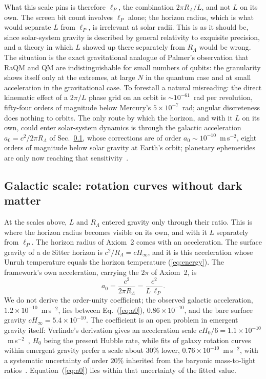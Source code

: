\documentclass[aps,prd,twocolumn,superscriptaddress,nofootinbib,showkeys]{revtex4-2}
\begin{document}
What this scale pins is therefore $\ell_P$, the combination $2\pi R_\Lambda/L$, and not $L$ on its own. The screen bit count involves $\ell_P$ alone; the horizon radius, which is what would separate $L$ from $\ell_P$, is irrelevant at solar radii. This is as it should be, since solar-system gravity is described by general relativity to exquisite precision, and a theory in which $L$ showed up there separately from $R_\Lambda$ would be wrong. The situation is the exact gravitational analogue of Palmer's observation that RaQM and QM are indistinguishable for small numbers of qubits: the granularity shows itself only at the extremes, at large $N$ in the quantum case and at small acceleration in the gravitational case. To forestall a natural misreading: the direct kinematic effect of a $2\pi/L$ phase grid on an orbit is $\sim10^{-61}$~rad per revolution, fifty-four orders of magnitude below Mercury's $5\times10^{-7}$~rad; angular discreteness does nothing to orbits. The only route by which the horizon, and with it $L$ on its own, could enter solar-system dynamics is through the galactic acceleration $a_0 = c^2/2\pi R_\Lambda$ of Sec.~\ref{sec:galactic}, whose corrections are of order $a_0\sim10^{-10}$~m\,s$^{-2}$, eight orders of magnitude below solar gravity at Earth's orbit; planetary ephemerides are only now reaching that sensitivity~\cite{hees2014}.

\subsection{Galactic scale: rotation curves without dark matter}\label{sec:galactic}

At the scales above, $L$ and $R_\Lambda$ entered gravity only through their ratio. This is where the horizon radius becomes visible on its own, and with it $L$ separately from $\ell_P$. The horizon radius of Axiom~2 comes with an acceleration. The surface gravity of a de Sitter horizon is $c^2/R_\Lambda = cH_\infty$, and it is this acceleration whose Unruh temperature equals the horizon temperature (\ref{eq:energy}). The framework's own acceleration, carrying the $2\pi$ of Axiom~2, is
\begin{equation}
a_0 = \frac{c^2}{2\pi R_\Lambda} = \frac{c^2}{L\,\ell_P} .
\label{eq:a0}
\end{equation}
We do not derive the order-unity coefficient; the observed galactic acceleration, $1.2\times10^{-10}$~m\,s$^{-2}$, lies between Eq.~(\ref{eq:a0}), $0.86\times10^{-10}$, and the bare surface gravity $cH_\infty = 5.4\times10^{-10}$. The coefficient is an open problem in emergent gravity itself: Verlinde's derivation gives an acceleration scale $cH_0/6 = 1.1\times10^{-10}$~m\,s$^{-2}$~\cite{verlinde2017}, $H_0$ being the present Hubble rate, while fits of galaxy rotation curves within emergent gravity prefer a scale about $30\%$ lower, $0.76\times10^{-10}$~m\,s$^{-2}$, with a systematic uncertainty of order $20\%$ inherited from the baryonic mass-to-light ratios~\cite{yoon2025,yoon2023}. Equation~(\ref{eq:a0}) lies within that uncertainty of the fitted value.
\end{document}
